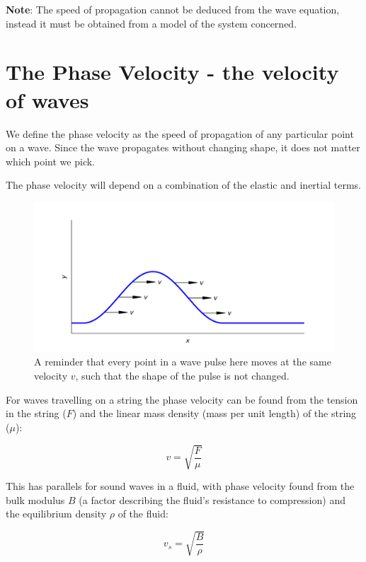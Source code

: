 \documentclass[
]{book}
\begin{document}
\textbf{Note}: The speed of propagation cannot be deduced from the wave equation, instead it must be obtained from a model of the system concerned.

\hypertarget{sec:ch6-phasevelocity}{%
\section{The Phase Velocity - the velocity of waves}\label{sec:ch6-phasevelocity}}

We define the phase velocity as the speed of propagation of any particular point on a wave. Since the wave propagates without changing shape, it does not matter which point we pick.

The phase velocity will depend on a combination of the elastic and inertial terms.

\begin{figure}

{\centering \includegraphics[width=0.7\linewidth]{visualisations/ch6-phasevelocity1} 

}

\caption{A reminder that every point in a wave pulse here moves at the same velocity $v$, such that the shape of the pulse is not changed.}\label{fig:ch6-phasevelocity1}
\end{figure}

For waves travelling on a string the phase velocity can be found from the tension in the string (\(F\)) and the linear mass density (mass per unit length) of the string (\(\mu\)):

\begin{equation}
v = \sqrt{\frac{F}{\mu}}
\end{equation}

This has parallels for sound waves in a fluid, with phase velocity found from the bulk modulus \(B\) (a factor describing the fluid's resistance to compression) and the equilibrium density \(\rho\) of the fluid:

\begin{equation}
v_s = \sqrt{\frac{B}{\rho}}
\end{equation}
\end{document}
